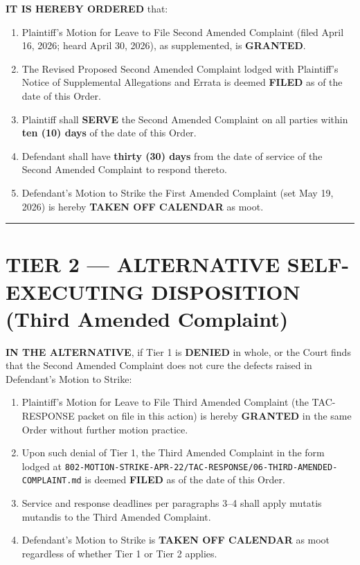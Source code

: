 \textbf{IT IS HEREBY ORDERED} that:

\begin{enumerate}
\def\labelenumi{\arabic{enumi}.}
\item
  Plaintiff's Motion for Leave to File Second Amended Complaint (filed April 16, 2026; heard April 30, 2026), as supplemented, is \textbf{GRANTED}.
\item
  The Revised Proposed Second Amended Complaint lodged with Plaintiff's Notice of Supplemental Allegations and Errata is deemed \textbf{FILED} as of the date of this Order.
\item
  Plaintiff shall \textbf{SERVE} the Second Amended Complaint on all parties within \textbf{ten (10) days} of the date of this Order.
\item
  Defendant shall have \textbf{thirty (30) days} from the date of service of the Second Amended Complaint to respond thereto.
\item
  Defendant's Motion to Strike the First Amended Complaint (set May 19, 2026) is hereby \textbf{TAKEN OFF CALENDAR} as moot.
\end{enumerate}

\begin{center}\rule{0.5\linewidth}{0.5pt}\end{center}

\section{TIER 2 --- ALTERNATIVE SELF-EXECUTING DISPOSITION (Third Amended Complaint)}\label{tier-2-alternative-self-executing-disposition-third-amended-complaint}

\textbf{IN THE ALTERNATIVE}, if Tier 1 is \textbf{DENIED} in whole, or the Court finds that the Second Amended Complaint does not cure the defects raised in Defendant's Motion to Strike:

\begin{enumerate}
\def\labelenumi{\arabic{enumi}.}
\setcounter{enumi}{5}
\item
  Plaintiff's Motion for Leave to File Third Amended Complaint (the TAC-RESPONSE packet on file in this action) is hereby \textbf{GRANTED} in the same Order without further motion practice.
\item
  Upon such denial of Tier 1, the Third Amended Complaint in the form lodged at \texttt{802-MOTION-STRIKE-APR-22/TAC-RESPONSE/06-THIRD-AMENDED-COMPLAINT.md} is deemed \textbf{FILED} as of the date of this Order.
\item
  Service and response deadlines per paragraphs 3--4 shall apply mutatis mutandis to the Third Amended Complaint.
\item
  Defendant's Motion to Strike is \textbf{TAKEN OFF CALENDAR} as moot regardless of whether Tier 1 or Tier 2 applies.
\end{enumerate}

